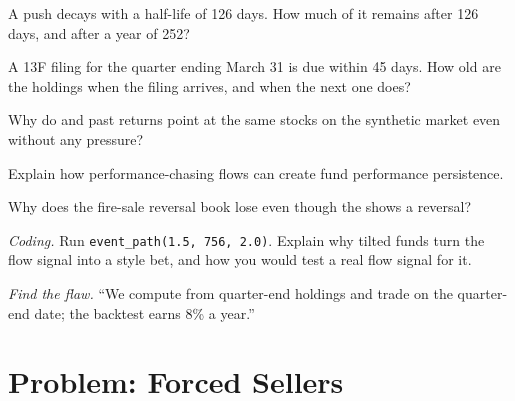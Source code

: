 \begin{exercise}[$\star$]\label{exo:s1:flows:2}
A push decays with a half-life of 126 days. How much of it remains after 126 days, and after a year of 252?
\end{exercise}

\begin{exercise}[$\star$]\label{exo:s1:flows:3}
A 13F filing for the quarter ending March 31 is due within 45 days. How old are the holdings when the filing arrives, and when the next one does?
\end{exercise}

\begin{exercise}[$\star\star$]\label{exo:s1:flows:4}
Why do  and past returns point at the same stocks on the synthetic market even without any pressure?
\end{exercise}

\begin{exercise}[$\star\star$]\label{exo:s1:flows:5}
Explain how performance-chasing flows can create fund performance persistence.
\end{exercise}

\begin{exercise}[$\star\star$]\label{exo:s1:flows:6}
Why does the fire-sale reversal book lose even though the  shows a reversal?
\end{exercise}

\begin{exercise}[$\star\star\star$]\label{exo:s1:flows:7}
\emph{Coding.} Run \texttt{event\_path(1.5, 756, 2.0)}. Explain why tilted funds turn the flow signal into a style bet, and how you would test a real flow
signal for it.
\end{exercise}

\begin{exercise}[$\star\star\star$]\label{exo:s1:flows:8}
\emph{Find the flaw.} ``We compute  from quarter-end holdings and trade on the quarter-end date; the backtest earns 8\% a year.''
\end{exercise}

\section{Problem: Forced Sellers}

